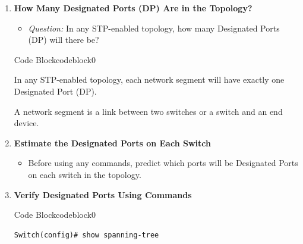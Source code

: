 \documentclass[a4paper]{book}
\begin{document}
\begin{enumerate}
\begin{ocg}{Code Block}{codeblock}{0}
\begin{tcolorbox}
{				      Total Root Ports = 5
			      }
		      \end{tcolorbox}
	      \end{ocg}


	\item \textbf{How Many Designated Ports (DP) Are in the Topology?}
	      \begin{itemize}
		      \item \textit{Question:} In any STP-enabled topology, how many Designated Ports (DP) will there be?
	      \end{itemize}



	      \begin{ocg}{Code Block}{codeblock}{0}
		      \vspace{0.5cm}
		      \begin{tcolorbox}
			      \small{
				      In any STP-enabled topology, each network segment will have exactly one Designated Port (DP).

				      A network segment is a link between two switches or a switch and an end device.
			      }
		      \end{tcolorbox}
	      \end{ocg}


	\item \textbf{Estimate the Designated Ports on Each Switch}
	      \begin{itemize}
		      \item Before using any commands, predict which ports will be Designated Ports on each switch in the topology.
	      \end{itemize}

	\item \textbf{Verify Designated Ports Using Commands}


	      \begin{ocg}{Code Block}{codeblock}{0}
		      \vspace{0.5cm}
		      \begin{lstlisting}
Switch(config)# show spanning-tree
\end{lstlisting}


\end{ocg}
\end{enumerate}
\end{document}
